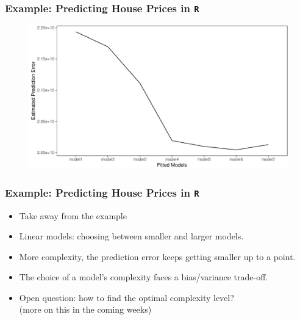 \documentclass[
  shownotes,
  xcolor={svgnames},
  hyperref={colorlinks,citecolor=DarkBlue,linkcolor=DarkRed,urlcolor=DarkBlue}
  , aspectratio=169]{beamer}
\begin{document}
\begin{frame}[fragile]
\frametitle{Example: Predicting House Prices in \texttt{R}}

   \begin{figure}[H] \centering
            \captionsetup{justification=centering}  
            \includegraphics[scale=.4]{figures/mse_plot_ch3-1.pdf}
    \end{figure}

\end{frame}
\begin{frame}[fragile]
\frametitle{Example: Predicting House Prices in \texttt{R}}


\begin{itemize}
  \item Take away from the example
  \bigskip
  \item Linear models: choosing between smaller and larger models.
  \bigskip
  \item More complexity, the prediction error keeps getting smaller up to a point.
  \bigskip
  \item The choice of a model's complexity faces a bias/variance trade-off.  
  \bigskip
  \item Open question: how to find the optimal complexity level? \\ {\tiny (more on this in the coming weeks)}

\end{itemize}


\end{frame}

\end{document}
